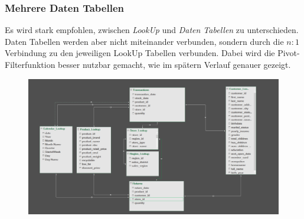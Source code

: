 \subsubsection{Mehrere Daten Tabellen}
Es wird stark empfohlen, zwischen \textit{LookUp} und \textit{Daten Tabellen} zu unterschieden.
Daten Tabellen werden aber nicht miteinander verbunden, sondern durch die $n:1$ Verbindung zu den jeweiligen LookUp Tabellen verbunden. Dabei wird die Pivot-Filterfunktion besser nutzbar gemacht, wie im spätern Verlauf genauer gezeigt.  
\begin{figure}[H]
	\centering
	\includegraphics[scale = 0.3]{attachment/chapter_1/screenshot062}
	\caption{}
	\label{fig:screenshot062}
\end{figure}
